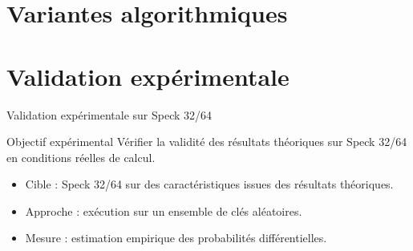 \section{Variantes algorithmiques}



\section{Validation expérimentale}

\begin{frame}{Validation expérimentale sur Speck 32/64}

    \begin{block}{Objectif expérimental}
        Vérifier la validité des résultats théoriques sur Speck 32/64 en conditions réelles de calcul.
    \end{block}

    \vspace{0.2cm}

    \begin{itemize}\small
        \item Cible : Speck 32/64 sur des caractéristiques issues des résultats théoriques.
        \item Approche : exécution sur un ensemble de clés aléatoires.
        \item Mesure : estimation empirique des probabilités différentielles.
    \end{itemize}

    \vspace{0.2cm}


    \vspace{0.2cm}

\end{frame}

